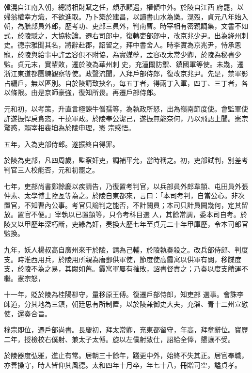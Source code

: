 \begin{pinyinscope}
 韓滉自江南入朝，總將相財賦之任，頗承顧遇，權傾中外。於陵自江西
 府罷，以婦翁權幸方熾，不欲進取。乃卜築於建昌，以讀書山水為樂。滉歿，貞元八年始入朝，為膳部員外郎，歷考功、吏部三員外，判南曹。時宰相有密親調集，文書不如式，於陵駁之，大協物論。遷右司郎中，復轉吏部郎中，改京兆少尹。出為絳州刺史。德宗雅聞其名，將辭赴郡，詔留之，拜中書舍人。時李實為京兆尹，恃承恩寵，於陵與給事中許孟容俱不附協，為實媒孽，孟容改太常少卿，於陵為秘書少監。貞元末，實輩敗，遷於陵為華州刺
 史，充潼關防禦、鎮國軍等使。未幾，遷浙江東道都團練觀察等使。政聲流聞，入拜戶部侍郎，復改京兆尹。先是，禁軍影占編戶，無以區別。自於陵請致挾名，每五丁者，得兩丁入軍，四丁、三丁者，各以條限。由是京師豪強，復知所畏。再遷戶部侍郎。



 元和初，以考策，升直言極諫牛僧孺等，為執政所怒，出為嶺南節度使。會監軍使許遂振悍戾貪恣，干撓軍政。於陵奉公潔己，遂振無能奈何，乃以飛語上聞。憲宗驚惑，賴宰相裴垍為於陵申理，憲
 宗感悟。



 五年，入為吏部侍郎。遂振終自得罪。



 於陵為吏部，凡四周歲，監察奸吏，調補平允，當時稱之。初，吏部試判，別差考判官三人校能否，元和初罷之。



 七年，吏部尚書鄭餘慶以疾請告，乃復置考判官，以兵部員外郎韋顗、屯田員外張仲素、太學博士陸亙等為之。於陵自東都來，言曰：「本司考判，自當公心。非次置官，不知曹內公事。考官只論判之能否，不計闕員；本司只計員闕幾何，定其留放。置官不便。」宰執以已置顗等，只令考科目選
 人，其餘常調，委本司自考。於陵又以甲歷年深朽斷，吏緣為奸，奏換大歷七年至貞元二十年甲庫歷，令本司郎官監換。



 九年，妖人楊叔高自廣州來干於陵，請為己輔，於陵執奏殺之。改兵部侍郎、判度支。時淮西用兵，於陵用所親為唐鄧供軍使，節度使高霞寓以供軍有闕，移牒度支，於陵不為之易，其闕如舊。霞寓軍屢有摧敗，詔書督責之；乃奏以度支饋運不繼。憲宗怒，



 十一年，貶於陵為桂陽郡守，量移原王傅。復遷戶部侍郎，知吏部
 選事。會誅李師道，分其地為三鎮，朝廷思有所制置，以於陵兼御史大夫，充淄、青十二州宣慰使，還奏合旨。



 穆宗即位，遷戶部尚書。長慶初，拜太常卿，充東都留守，年高，拜章辭位。寶歷二年，授檢校右僕射、兼太子太傅。旋以左僕射致仕，詔給全俸，懇讓不受。



 於陵器度弘雅，進止有常。居朝三十餘年，踐更中外，始終不失其正。居官奉職，亦善操守，時人皆仰其風德。太和四年十月卒，年七十八，冊贈司空，謚貞孝。




\end{pinyinscope}
